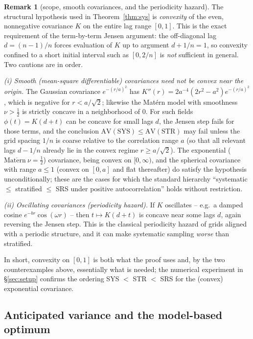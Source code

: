 \documentclass{amsart}
\theoremstyle{definition}
\newtheorem{remark}[theorem]{Remark}
\begin{document}
\begin{remark}[scope, smooth covariances, and the periodicity hazard]
\label{rem:scope}
The structural hypothesis used in Theorem~\ref{thm:sys} is \emph{convexity}
of the even, nonnegative covariance $K$ on the entire lag range $[0,1]$.
This is the exact requirement of the term-by-term Jensen argument: the
off-diagonal lag $d=(n-1)/n$ forces evaluation of $K$ up to argument
$d+1/n=1$, so convexity confined to a short initial interval such as
$[0,2/n]$ is \emph{not} sufficient in general. Two cautions are in order.

\emph{(i) Smooth (mean-square differentiable) covariances need not be
convex near the origin.} The Gaussian covariance $e^{-(r/a)^2}$ has
$K''(r)=2a^{-4}(2r^2-a^2)e^{-(r/a)^2}$, which is negative for
$r<a/\sqrt2$; likewise the Mat\'ern model with smoothness $\nu>\tfrac12$ is
strictly concave in a neighborhood of $0$. For such fields $\phi(t)=K(d+t)$
can be concave for small lags $d$, the Jensen step fails for those terms,
and the conclusion $\mathrm{AV}(\mathrm{SYS})\le\mathrm{AV}(\mathrm{STR})$
may fail unless the grid spacing $1/n$ is coarse relative to the
correlation range $a$ (so that all relevant lags $d-1/n$ already lie in the
convex regime $r\ge a/\sqrt2$). The exponential ($\mathrm{Mat\acute ern}\
\nu=\tfrac12$) covariance, being convex on $[0,\infty)$, and the spherical
covariance with range $a\le1$ (convex on $[0,a]$ and flat thereafter) do
satisfy the hypothesis unconditionally; these are the cases for which the
standard hierarchy ``systematic $\le$ stratified $\le$ SRS under positive
autocorrelation'' holds without restriction.

\emph{(ii) Oscillating covariances (periodicity hazard).} If $K$
oscillates -- e.g.\ a damped cosine $e^{-br}\cos(\omega r)$ -- then
$t\mapsto K(d+t)$ is concave near some lags $d$, again reversing the Jensen
step. This is the classical periodicity hazard of grids aligned with a
periodic structure, and it can make systematic sampling \emph{worse} than
stratified.

In short, convexity on $[0,1]$ is both what the proof uses and, by the two
counterexamples above, essentially what is needed; the numerical experiment
in \S\ref{sec:setup} confirms the ordering SYS $<$ STR $<$ SRS for the
(convex) exponential covariance.
\end{remark}

\subsection{Anticipated variance and the model-based optimum}
\label{ssec:anticipated}
\end{document}
